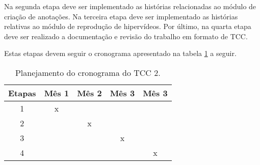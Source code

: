 Na segunda etapa deve ser implementado as histórias relacionadas ao módulo de criação de anotações. Na terceira etapa deve ser implementado as histórias relativas ao módulo de reprodução de hipervídeos. Por último, na quarta etapa deve ser realizado a documentação e revisão do trabalho em formato de TCC.

Estas etapas devem seguir o cronograma apresentado na tabela \ref{tab:plantcc2} a seguir.

\begin{table}[h!]
	\centering
	\begin{tabular}{| c | c | c | c | c |}
		\hline
		Etapas & Mês 1 & Mês 2 & Mês 3 & Mês 3 \\
		\hline
		\hline
		1 & x & & & \\
		\hline
		2 & & x & & \\
		\hline		
		3 & & & x & \\
		\hline
		4 & & & & x \\
		\hline
	\end{tabular}
	\caption{Planejamento do cronograma do TCC 2.}
	\label{tab:plantcc2}
\end{table}
